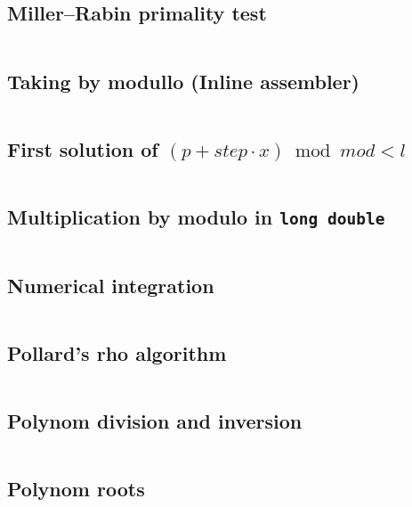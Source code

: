 \documentclass{article}
\begin{document}
\subsection{Miller–Rabin primality test}
\inputminted[mathescape, breaklines, breakafter=(, tabsize=2, frame=lines, showtabs, tab=|\ , tabcolor=lightgray]{c++}{./numeric/miller-rabin/miller-rabin.cpp}
\subsection{Taking by modullo (Inline assembler)}
\inputminted[mathescape, breaklines, breakafter=(, tabsize=2, frame=lines, showtabs, tab=|\ , tabcolor=lightgray]{c++}{./numeric/mod-asm/mod-asm.cpp}
\subsection{First solution of $(p + step \cdot x) \bmod mod < l$}
\inputminted[mathescape, breaklines, breakafter=(, tabsize=2, frame=lines, showtabs, tab=|\ , tabcolor=lightgray]{c++}{./numeric/mod-ineq-first-sol/mod-ineq-first-sol.cpp}
\subsection{Multiplication by modulo in \texttt{long double}}
\inputminted[mathescape, breaklines, breakafter=(, tabsize=2, frame=lines, showtabs, tab=|\ , tabcolor=lightgray]{c++}{./numeric/mult-by-mod/mult-by-mod.cpp}
\subsection{Numerical integration}
\inputminted[mathescape, breaklines, breakafter=(, tabsize=2, frame=lines, showtabs, tab=|\ , tabcolor=lightgray]{c++}{./numeric/numerical-integration/numerical-integration.cpp}
\subsection{Pollard's rho algorithm}
\inputminted[mathescape, breaklines, breakafter=(, tabsize=2, frame=lines, showtabs, tab=|\ , tabcolor=lightgray]{c++}{./numeric/pollard/pollard.cpp}
\subsection{Polynom division and inversion}
\inputminted[mathescape, breaklines, breakafter=(, tabsize=2, frame=lines, showtabs, tab=|\ , tabcolor=lightgray]{c++}{./numeric/polynom-division/polynom-division.cpp}
\subsection{Polynom roots}
\inputminted[mathescape, breaklines, breakafter=(, tabsize=2, frame=lines, showtabs, tab=|\ , tabcolor=lightgray]{c++}{./numeric/polynom-roots/polynom-roots.cpp}
\end{document}

